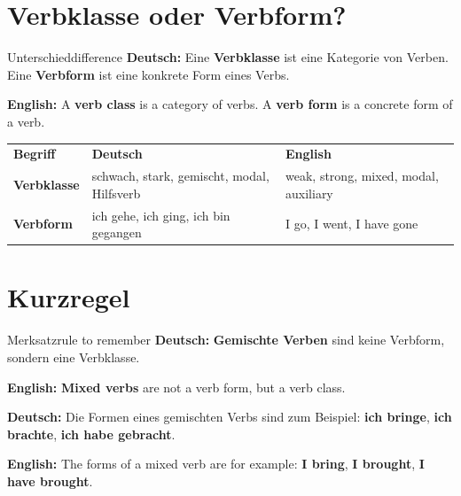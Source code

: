 \documentclass[a4paper,11pt]{article}
\newcommand{\GermanText}[1]{\textbf{Deutsch: }#1\par}
\newcommand{\EnglishText}[1]{{\small\color{SoftGray}\textbf{English: }#1\par}}
\begin{document}
\section{Verbklasse oder Verbform?}

\begin{grammarentry}{Unterschied}{difference}
\GermanText{Eine \textbf{Verbklasse} ist eine Kategorie von Verben. Eine \textbf{Verbform} ist eine konkrete Form eines Verbs.}
\EnglishText{A \textbf{verb class} is a category of verbs. A \textbf{verb form} is a concrete form of a verb.}

\begin{tabularx}{\textwidth}{>{\bfseries}p{3cm}X X}
\rowcolor{HeaderBlueDark}
\color{white}\textbf{Begriff} & \color{white}\textbf{Deutsch} & \color{white}\textbf{English} \\
Verbklasse & schwach, stark, gemischt, modal, Hilfsverb & weak, strong, mixed, modal, auxiliary \\
Verbform & ich gehe, ich ging, ich bin gegangen & I go, I went, I have gone \\
\end{tabularx}
\end{grammarentry}

\section{Kurzregel}

\begin{grammarentry}{Merksatz}{rule to remember}
\GermanText{\textbf{Gemischte Verben} sind keine Verbform, sondern eine Verbklasse.}
\EnglishText{\textbf{Mixed verbs} are not a verb form, but a verb class.}

\GermanText{Die Formen eines gemischten Verbs sind zum Beispiel: \textbf{ich bringe}, \textbf{ich brachte}, \textbf{ich habe gebracht}.}
\EnglishText{The forms of a mixed verb are for example: \textbf{I bring}, \textbf{I brought}, \textbf{I have brought}.}
\end{grammarentry}
\end{document}
